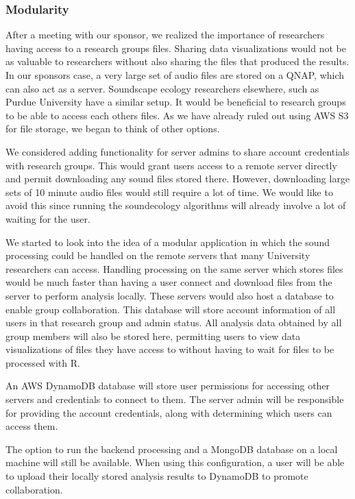 \subsubsection{Modularity}
After a meeting with our sponsor, we realized the importance of researchers having access to a research group\textquotesingle s files. Sharing data visualizations would not be as valuable to researchers without also sharing the files that produced the results. In our sponsor\textquotesingle s case, a very large set of audio files are stored on a QNAP, which can also act as a server. Soundscape ecology researchers elsewhere, such as Purdue University have a similar setup. It would be beneficial to research groups to be able to access each other\textquotesingle s files. As we have already ruled out using AWS S3 for file storage, we began to think of other options.\par
We considered adding functionality for server admins to share account credentials with research groups. This would grant users access to a remote server directly and permit downloading any sound files stored there. However, downloading large sets of 10 minute audio files would still require a lot of time. We would like to avoid this since running the soundecology algorithms will already involve a lot of waiting for the user.\par
We started to look into the idea of a modular application in which the sound processing could be handled on the remote servers that many University researchers can access. Handling processing on the same server which stores files would be much faster than having a user connect and download files from the server to perform analysis locally. These servers would also host a database to enable group collaboration. This database will store account information of all users in that research group and admin status. All analysis data obtained by all group members will also be stored here, permitting users to view data visualizations of files they have access to without having to wait for files to be processed with R.\par
An AWS DynamoDB database will store user permissions for accessing other servers and credentials to connect to them. The server admin will be responsible for providing the account credentials, along with determining which users can access them.\par
The option to run the backend processing and a MongoDB database on a local machine will still be available. When using this configuration, a user will be able to upload their locally stored analysis results to DynamoDB to promote collaboration.\par

